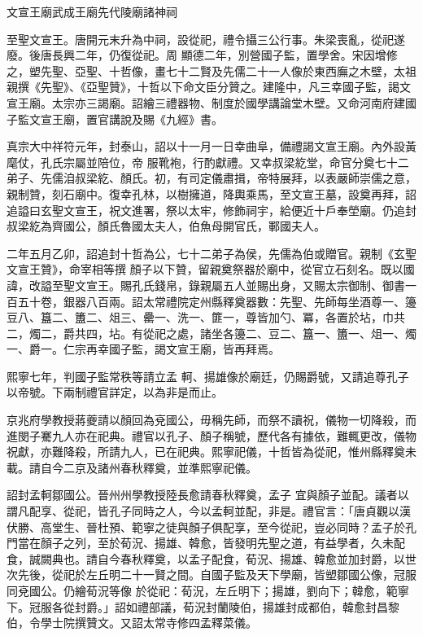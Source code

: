
\begin{pinyinscope}

 文宣王廟武成王廟先代陵廟諸神祠



 至聖文宣王。唐開元末升為中祠，設從祀，禮令攝三公行事。朱梁喪亂，從祀遂廢。後唐長興二年，仍復從祀。周
 顯德二年，別營國子監，置學舍。宋因增修之，塑先聖、亞聖、十哲像，畫七十二賢及先儒二十一人像於東西廡之木壁，太祖親撰《先聖》、《亞聖贊》，十哲以下命文臣分贊之。建隆中，凡三幸國子監，謁文宣王廟。太宗亦三謁廟。詔繪三禮器物、制度於國學講論堂木壁。又命河南府建國子監文宣王廟，置官講說及賜《九經》書。



 真宗大中祥符元年，封泰山，詔以十一月一日幸曲阜，備禮謁文宣王廟。內外設黃麾仗，孔氏宗屬並陪位，帝
 服靴袍，行酌獻禮。又幸叔梁紇堂，命官分奠七十二弟子、先儒洎叔梁紇、顏氏。初，有司定儀肅揖，帝特展拜，以表嚴師崇儒之意，親制贊，刻石廟中。復幸孔林，以樹擁道，降輿乘馬，至文宣王墓，設奠再拜，詔追謚曰玄聖文宣王，祝文進署，祭以太牢，修飾祠宇，給便近十戶奉塋廟。仍追封叔梁紇為齊國公，顏氏魯國太夫人，伯魚母開官氏，鄆國夫人。



 二年五月乙卯，詔追封十哲為公，七十二弟子為侯，先儒為伯或贈官。親制《玄聖文宣王贊》，命宰相等撰
 顏子以下贊，留親奠祭器於廟中，從官立石刻名。既以國諱，改謚至聖文宣王。賜孔氏錢帛，錄親屬五人並賜出身，又賜太宗御制、御書一百五十卷，銀器八百兩。詔太常禮院定州縣釋奠器數：先聖、先師每坐酒尊一、籩豆八、簋二、簠二、俎三、罍一、洗一、篚一，尊皆加勺、冪，各置於坫，巾共二，燭二，爵共四，坫。有從祀之處，諸坐各籩二、豆二、簋一、簠一、俎一、燭一、爵一。仁宗再幸國子監，謁文宣王廟，皆再拜焉。



 熙寧七年，判國子監常秩等請立孟
 軻、揚雄像於廟廷，仍賜爵號，又請追尊孔子以帝號。下兩制禮官詳定，以為非是而止。



 京兆府學教授蔣夔請以顏回為兗國公，毋稱先師，而祭不讀祝，儀物一切降殺，而進閔子騫九人亦在祀典。禮官以孔子、顏子稱號，歷代各有據依，難輒更改，儀物祝獻，亦難降殺，所請九人，已在祀典。熙寧祀儀，十哲皆為從祀，惟州縣釋奠未載。請自今二京及諸州春秋釋奠，並準熙寧祀儀。



 詔封孟軻鄒國公。晉州州學教授陸長愈請春秋釋奠，孟子
 宜與顏子並配。議者以謂凡配享、從祀，皆孔子同時之人，今以孟軻並配，非是。禮官言：「唐貞觀以漢伏勝、高堂生、晉杜預、範寧之徒與顏子俱配享，至今從祀，豈必同時？孟子於孔門當在顏子之列，至於荀況、揚雄、韓愈，皆發明先聖之道，有益學者，久未配食，誠闕典也。請自今春秋釋奠，以孟子配食，荀況、揚雄、韓愈並加封爵，以世次先後，從祀於左丘明二十一賢之間。自國子監及天下學廟，皆塑鄒國公像，冠服同兗國公。仍繪荀況等像
 於從祀：荀況，左丘明下；揚雄，劉向下；韓愈，範寧下。冠服各從封爵。」詔如禮部議，荀況封蘭陵伯，揚雄封成都伯，韓愈封昌黎伯，令學士院撰贊文。又詔太常寺修四孟釋菜儀。




\end{pinyinscope}
